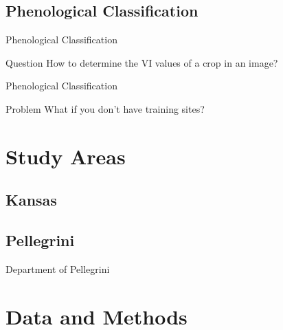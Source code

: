 \documentclass[draft,compress]{beamer}
\begin{document}
\subsection{Phenological Classification}
\begin{frame}{Phenological Classification}
\begingroup
{}
\begin{block}{Question}
  How to determine the VI values of a crop in an image?
\end{block}
\endgroup
{}
\end{frame}

\begin{frame}{Phenological Classification}
\begin{alertblock}{Problem}
  What if you don’t have training sites?
\end{alertblock}
\end{frame}


\section{Study Areas}

\subsection{Kansas}
\begin{frame}{}
	
\end{frame}


\subsection{Pellegrini}
\begin{frame}{Department of Pellegrini}
	
\end{frame}


\section{Data and Methods}
\end{document}
